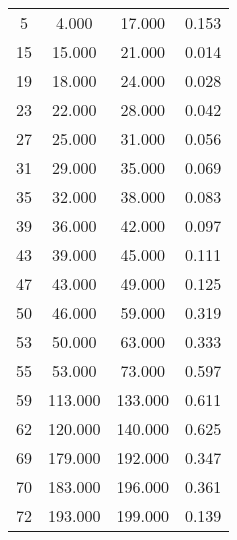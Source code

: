 % 
\begin{tabular}{cccc}
  \hline
  \hline
5 & 4.000 & 17.000 & 0.153 \\ 
  15 & 15.000 & 21.000 & 0.014 \\ 
  19 & 18.000 & 24.000 & 0.028 \\ 
  23 & 22.000 & 28.000 & 0.042 \\ 
  27 & 25.000 & 31.000 & 0.056 \\ 
  31 & 29.000 & 35.000 & 0.069 \\ 
  35 & 32.000 & 38.000 & 0.083 \\ 
  39 & 36.000 & 42.000 & 0.097 \\ 
  43 & 39.000 & 45.000 & 0.111 \\ 
  47 & 43.000 & 49.000 & 0.125 \\ 
  50 & 46.000 & 59.000 & 0.319 \\ 
  53 & 50.000 & 63.000 & 0.333 \\ 
  55 & 53.000 & 73.000 & 0.597 \\ 
  59 & 113.000 & 133.000 & 0.611 \\ 
  62 & 120.000 & 140.000 & 0.625 \\ 
  69 & 179.000 & 192.000 & 0.347 \\ 
  70 & 183.000 & 196.000 & 0.361 \\ 
  72 & 193.000 & 199.000 & 0.139 \\ 
   \hline
\end{tabular}
